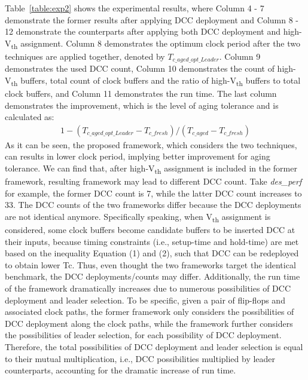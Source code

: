 Table~\ref{table:exp2} shows the experimental results, where Column 4 - 7 demonstrate the former results after applying DCC deployment  and Column 8 - 12 demonstrate the counterparts after applying both DCC deployment and high-V\textsubscript{th} assignment. Column 8 demonstrates the optimum clock period after the two techniques are applied together, denoted by $T_{c\_aged\_opt\_Leader}$. Column 9 demonstrates the used DCC count, Column 10 demonstrates the count of high-V\textsubscript{th} buffers, total count of clock buffers and the ratio of high-V\textsubscript{th} buffers to total clock buffers, and Column 11 demonstrates the run time. The last column demonstrates the improvement, which is the level of aging tolerance and is calculated as:
\begin{gather*}
1 - (T_{c\_aged\_opt\_Leader} - T_{c\_fresh}) / (T_{c\_aged} - T_{c\_fresh})
\end{gather*}
As it can be seen, the proposed framework, which considers the two techniques, can results in lower clock period, implying better improvement for aging tolerance. We can find that, after high-V\textsubscript{th} assignment is included in the former framework, resulting framework may lead to different DCC count. Take \textit{des\_perf} for example, the former DCC count is 7, while the latter DCC count increases to 33. The DCC counts of the two frameworks differ because the DCC deployments are not identical anymore. Specifically speaking, when V\textsubscript{th} assignment is considered, some clock buffers become candidate buffers to be inserted DCC at their inputs, because timing constraints (i.e., setup-time and hold-time) are met based on the inequality Equation (1) and (2), such that DCC can be redeployed to obtain lower Tc. Thus, even thought the two frameworks target the identical benchmark, the DCC deployments/counts may differ. Additionally, the run time of the framework dramatically increases due to numerous possibilities of DCC deployment and leader selection. To be specific, given a pair of flip-flops and associated clock paths, the former framework only considers the possibilities of DCC deployment along the clock paths, while the framework further considers the possibilities of leader selection, for each possibility of DCC deployment. Therefore, the total  possibilities of DCC deployment and leader selection is equal to their mutual multiplication, i.e., DCC possibilities multiplied by leader counterparts, accounting for the dramatic increase of run time.
